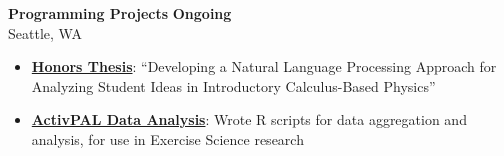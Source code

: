 \textbf{Programming Projects} \hfill \textbf{Ongoing}\\
Seattle, WA
    \squish
    \begin{itemize}
        \item \href{https://github.com/jonmgeiger/honors-project}{\textbf{Honors Thesis}}: ``Developing a Natural Language Processing Approach for Analyzing Student Ideas in Introductory Calculus-Based Physics''
        \item \href{https://github.com/jonmgeiger/activPAL}{\textbf{ActivPAL Data Analysis}}: Wrote R scripts for data aggregation and analysis, for use in Exercise Science research
    \end{itemize}